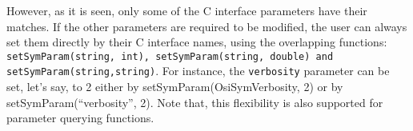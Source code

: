 However, as it is seen, only some of the C interface parameters have their 
matches. If the other parameters are required to be modified, the user 
can always set them directly by their C interface names, 
using the overlapping functions: {\tt setSymParam(string, int), 
setSymParam(string, double) and setSymParam(string,string)}. For instance, 
the {\tt verbosity} parameter can be set, let's say, to 2 either by 
setSymParam(OsiSymVerbosity, 2) or by setSymParam(``verbosity'', 2). 
Note that, this flexibility is also supported for parameter querying 
functions. 

